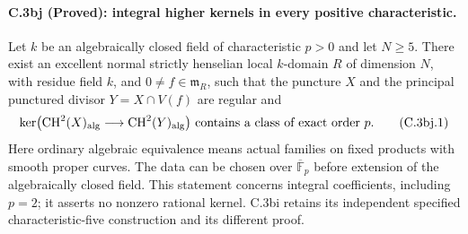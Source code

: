 \paragraph{C.3bj (Proved): integral higher kernels in every positive characteristic.}
Let $k$ be an algebraically closed field of characteristic $p>0$ and
let $N\ge5$. There exist an excellent normal strictly henselian local
$k$-domain $R$ of dimension $N$, with residue field $k$, and
$0\ne f\in\mathfrak m_R$, such that the puncture $X$ and the principal
punctured divisor $Y=X\cap V(f)$ are regular and
\[
 \ker\bigl(\mathrm{CH}^2(X)_{\rm alg}
       \longrightarrow\mathrm{CH}^2(Y)_{\rm alg}\bigr)
\text{ contains a class of exact order }p.
 \tag{C.3bj.1}
\]
Here ordinary algebraic equivalence means actual families on fixed
products with smooth proper curves. The data can be chosen over
$\overline{\mathbb F}_p$ before extension of the algebraically closed
field. This statement concerns integral coefficients, including $p=2$;
it asserts no nonzero rational kernel. C.3bi retains its independent
specified characteristic-five construction and its different proof.

